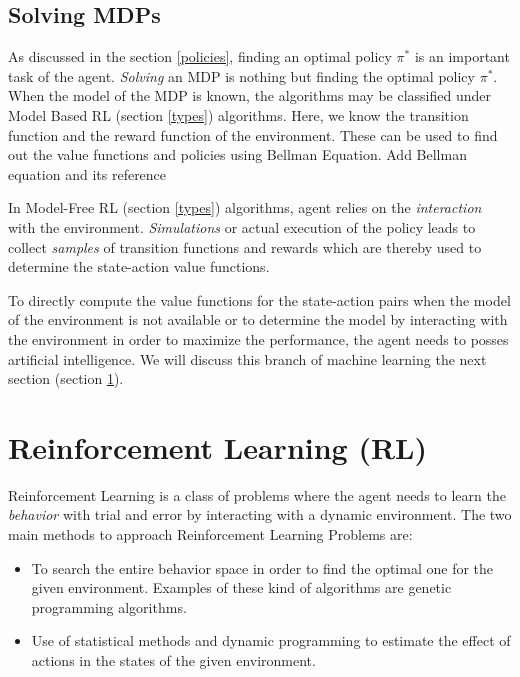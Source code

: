 \documentclass[12pt]{report}
\begin{document}
\subsection{Solving MDPs}
\label{bellman}
As discussed in the section \ref{policies}, finding an optimal policy $\pi^*$ is an important task of the agent. \textit{Solving} an MDP is nothing but finding the optimal policy $\pi^*$. When the model of the MDP is known, the algorithms may be classified under Model Based RL (section \ref{types}) algorithms. Here, we know the transition function and the reward function of the environment. These can be used to find out the value functions and policies using Bellman Equation. {\color{red} Add Bellman equation and its reference}\par 
In Model-Free RL (section \ref{types}) algorithms, agent relies on the \textit{interaction} with the environment. \textit{Simulations} or actual execution of the policy leads to collect \textit{samples} of transition functions and rewards which are thereby used to determine the state-action value functions.\par 
To directly compute the value functions for the state-action pairs when the model of the environment is not available or to determine the model by interacting with the environment in order to maximize the performance, the agent needs to posses artificial intelligence. We will discuss this branch of machine learning the next section (section \ref{rl}).

\section{Reinforcement Learning (RL)}
\label{rl}
Reinforcement Learning is a class of problems where the agent needs to learn the \textit{behavior} with trial and error by interacting with a dynamic environment. The two main methods to approach Reinforcement Learning Problems are:
\begin{itemize}
\item To search the entire behavior space in order to find the optimal one for the given environment. Examples of these kind of algorithms are genetic programming algorithms.
\item Use of statistical methods and dynamic programming to estimate the effect of actions in the states of the given environment. \cite{kaelbling1996reinforcement}
\end{itemize}
\end{document}
